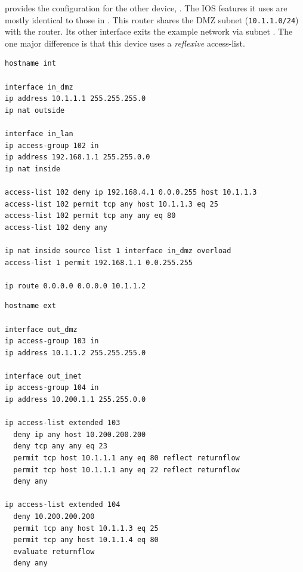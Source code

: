  provides the configuration for the
other device, . The IOS features it uses are mostly identical
to those in . This router
shares the DMZ subnet ({\small\verb$10.1.1.0/24$}) with the
 router. Its other interface exits the example network via subnet
. The one major difference is that this device uses
a \emph{reflexive} access-list.

\noindent\begin{minipage}{\linewidth}
\begin{lstlisting}[float=t,label=lst:initial-example-int,language=IOS,caption=Example IOS Configuration (1)]
hostname int

interface in_dmz
ip address 10.1.1.1 255.255.255.0
ip nat outside

interface in_lan
ip access-group 102 in
ip address 192.168.1.1 255.255.0.0
ip nat inside

access-list 102 deny ip 192.168.4.1 0.0.0.255 host 10.1.1.3
access-list 102 permit tcp any host 10.1.1.3 eq 25
access-list 102 permit tcp any any eq 80
access-list 102 deny any

ip nat inside source list 1 interface in_dmz overload
access-list 1 permit 192.168.1.1 0.0.255.255

ip route 0.0.0.0 0.0.0.0 10.1.1.2
\end{lstlisting}
\end{minipage}

\noindent\begin{minipage}{\linewidth}
\begin{lstlisting}[float=t,label=lst:initial-example-ext,language=IOS,caption=Example IOS Configuration (2)]
hostname ext

interface out_dmz
ip access-group 103 in
ip address 10.1.1.2 255.255.255.0

interface out_inet
ip access-group 104 in
ip address 10.200.1.1 255.255.0.0

ip access-list extended 103
  deny ip any host 10.200.200.200
  deny tcp any any eq 23
  permit tcp host 10.1.1.1 any eq 80 reflect returnflow
  permit tcp host 10.1.1.1 any eq 22 reflect returnflow
  deny any

ip access-list extended 104
  deny 10.200.200.200
  permit tcp any host 10.1.1.3 eq 25
  permit tcp any host 10.1.1.4 eq 80
  evaluate returnflow
  deny any
\end{lstlisting}
\end{minipage}

